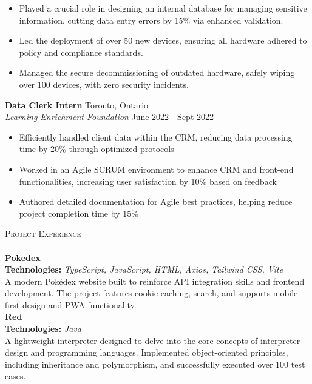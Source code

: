 \documentclass[letterpaper]{article} %
\newcommand{\lineunder} {
    \vspace*{-8pt} \\
    \hspace*{-18pt} \hrulefill \\
}
\newcommand{\header} [1] {
    {\hspace*{-18pt}\vspace*{6pt} \textsc{#1}}
    \vspace*{-6pt} \lineunder
}
\begin{document}
\vspace{-1mm}
\begin{itemize} \itemsep 1pt
    \item Played a crucial role in designing an internal database for managing sensitive information, cutting data entry errors by 15\% via enhanced validation.
    \item Led the deployment of over 50 new devices, ensuring all hardware adhered to policy and compliance standards.
    \item Managed the secure decommissioning of outdated hardware, safely wiping over 100 devices, with zero security incidents.
\end{itemize}
\textbf{Data Clerk Intern} \hfill Toronto, Ontario\\
\textit{Learning Enrichment Foundation} \hfill June 2022 - Sept 2022\\
\vspace{-1mm}
\begin{itemize} \itemsep 1pt
    \item Efficiently handled client data within the CRM, reducing data processing time by 20\% through optimized protocols
    \item Worked in an Agile SCRUM environment to enhance CRM and front-end functionalities, increasing user satisfaction by 10\% based on feedback
    \item Authored detailed documentation for Agile best practices, helping reduce project completion time by 15\%
\end{itemize}
\vspace{4mm}

\header{Project Experience}
{\textbf{Pokedex}} \\ 
\textbf{Technologies:} \textit{TypeScript, JavaScript, HTML, Axios, Tailwind CSS, Vite} \\
A modern Pokédex website built to reinforce API integration skills and frontend development. The project features cookie caching, search, and supports mobile-first design and PWA functionality.\\
\vspace*{4mm}
{\textbf{Red}} \\ 
\textbf{Technologies:} \textit{Java} \\ 
A lightweight interpreter designed to delve into the core concepts of interpreter design and programming languages. Implemented object-oriented principles, including inheritance and polymorphism, and successfully executed over 100 test cases.\\
\vspace*{4mm}
\end{document}
